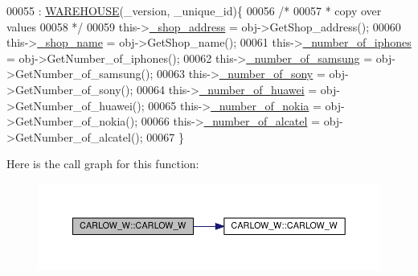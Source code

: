 \begin{DoxyCode}
00055                                                                         : 
      \hyperlink{class_w_a_r_e_h_o_u_s_e_a7a924d389af91f54ed0e1d1d8d56ec57_a7a924d389af91f54ed0e1d1d8d56ec57}{WAREHOUSE}(\_version, \_unique\_id)\{
00056         \textcolor{comment}{/*}
00057 \textcolor{comment}{         * copy over values
}
00058 \textcolor{comment}{         */}
00059         this->\hyperlink{class_c_a_r_l_o_w___w_acaa886b26f5a60d500f13709340d34cf_acaa886b26f5a60d500f13709340d34cf}{\_shop\_address} = obj->GetShop\_address();
00060         this->\hyperlink{class_c_a_r_l_o_w___w_ad3ae4ca82f06287d8ad5bec07a43561a_ad3ae4ca82f06287d8ad5bec07a43561a}{\_shop\_name} = obj->GetShop\_name();
00061         this->\hyperlink{class_c_a_r_l_o_w___w_aff9e9a986b6390d6fa51f52d43a8c0e8_aff9e9a986b6390d6fa51f52d43a8c0e8}{\_number\_of\_iphones} = obj->GetNumber\_of\_iphones();
00062         this->\hyperlink{class_c_a_r_l_o_w___w_ae47f54289c630e38341ce8b2c8decf0f_ae47f54289c630e38341ce8b2c8decf0f}{\_number\_of\_samsung} = obj->GetNumber\_of\_samsung();
00063         this->\hyperlink{class_c_a_r_l_o_w___w_a080de2e63290db84a0b9898682b74f6e_a080de2e63290db84a0b9898682b74f6e}{\_number\_of\_sony} = obj->GetNumber\_of\_sony();
00064         this->\hyperlink{class_c_a_r_l_o_w___w_acc2837ed943bb51134e5878e818970fd_acc2837ed943bb51134e5878e818970fd}{\_number\_of\_huawei} = obj->GetNumber\_of\_huawei();
00065         this->\hyperlink{class_c_a_r_l_o_w___w_ac4c7e47711cc4c9e0bc01fc37cabe7d1_ac4c7e47711cc4c9e0bc01fc37cabe7d1}{\_number\_of\_nokia} = obj->GetNumber\_of\_nokia();
00066         this->\hyperlink{class_c_a_r_l_o_w___w_acf1f9888b2ac011cd0e8bb49b10abd91_acf1f9888b2ac011cd0e8bb49b10abd91}{\_number\_of\_alcatel} = obj->GetNumber\_of\_alcatel();
00067     \}
\end{DoxyCode}


Here is the call graph for this function\+:\nopagebreak
\begin{figure}[H]
\begin{center}
\leavevmode
\includegraphics[width=350pt]{class_c_a_r_l_o_w___w_ad3b772ca2d09eba4a273cb0c7cece747_ad3b772ca2d09eba4a273cb0c7cece747_cgraph}
\end{center}
\end{figure}


